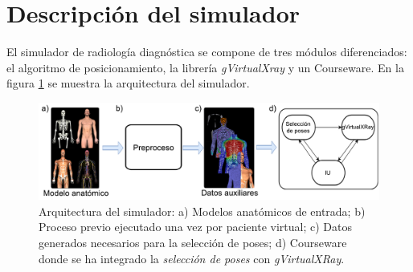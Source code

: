 


\section{Descripción del simulador} 
\label{xray:method}


El simulador de radiología diagnóstica se compone de tres módulos diferenciados: el algoritmo de posicionamiento, la librería \emph{gVirtualXray} y un \ac{Courseware}. En la figura \ref{fig:Posesummary} se muestra la arquitectura del simulador.

\begin{figure}[ht]
\centering
\includegraphics[width=\linewidth]{IMG/ArquXRAY.pdf}

\caption{\label{fig:Posesummary} Arquitectura del simulador: a) Modelos anatómicos de entrada; b) Proceso previo ejecutado una vez por paciente virtual; c) Datos generados necesarios para la selección de poses; d) \acs{Courseware} donde se ha integrado la \emph{selección de poses} con \emph{gVirtualXRay}.
}
\end{figure}

